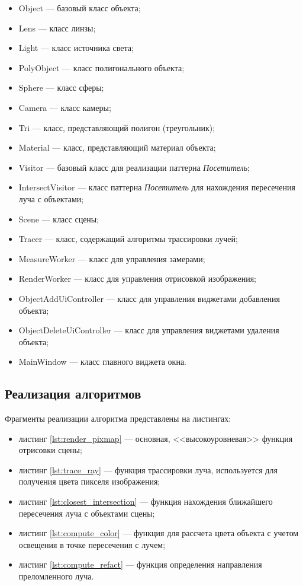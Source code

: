 \begin{itemize}
	\item Object --- базовый класс объекта;
	\item Lens --- класс линзы;
	\item Light --- класс источника света;
	\item PolyObject --- класс полигонального объекта;
	\item Sphere --- класс сферы;
	\item Camera --- класс камеры;
	\item Tri --- класс, представляющий полигон (треугольник);
	\item Material --- класс, представляющий материал объекта;
	\item Visitor --- базовый класс для реализации паттерна \textit{Посетитель};
	\item IntersectVisitor --- класс паттерна \textit{Посетитель} для нахождения пересечения луча с объектами;
	\item Scene --- класс сцены;
	\item Tracer --- класс, содержащий алгоритмы трассировки лучей;
	\item MeasureWorker --- класс для управления замерами;
	\item RenderWorker --- класс для управления отрисовкой изображения;
	\item ObjectAddUiController --- класс для управления виджетами добавления объекта;
	\item ObjectDeleteUiController --- класс для управления виджетами удаления объекта;
	\item MainWindow --- класс главного виджета окна.
\end{itemize}

\clearpage

\subsection{Реализация алгоритмов}

Фрагменты реализации алгоритма представлены на листингах:

\begin{itemize}
	\item листинг \ref{lst:render_pixmap} --- основная, <<высокоуровневая>> функция отрисовки сцены;
	\item листинг \ref{lst:trace_ray} --- функция трассировки луча, используется для получения цвета пикселя изображения;
	\item листинг \ref{lst:closest_intersection} --- функция нахождения ближайшего пересечения луча с объектами сцены;
	\item листинг \ref{lst:compute_color} --- функция для рассчета цвета объекта с учетом освещения в точке пересечения с лучем;
	\item листинг \ref{lst:compute_refact} --- функция определения направления преломленного луча.
\end{itemize}

